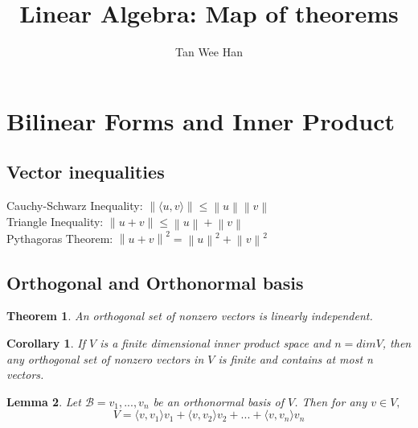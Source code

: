 \documentclass{article}
\newcommand{\norm}[1]{\left\lVert#1\right\rVert}
\newcommand{\innerproduct}[1]{\langle#1\rangle}
\newtheorem{theorem}{Theorem}[section]
\newtheorem{corollary}{Corollary}[theorem]
\newtheorem{lemma}[theorem]{Lemma}
\numberwithin{theorem}{subsection} %
\begin{document}
\title{\Large{\textbf{Linear Algebra: Map of theorems}}}
\author{Tan Wee Han}
\maketitle

\let\cleardoublepage\clearpage
\tableofcontents

\pagestyle{plain} %

\makeatletter
\makeatother


\section{Bilinear Forms and Inner Product}


\subsection{Vector inequalities}
Cauchy-Schwarz Inequality: $\norm{\innerproduct{u,v}} \leq \norm{u}\norm{v}$ \\
Triangle Inequality: $\norm{u+v} \leq \norm{u} + \norm{v}$ \\
Pythagoras Theorem: $\norm{u+v}^2 = \norm{u}^2 + \norm{v}^2$ \bigskip

\subsection{Orthogonal and Orthonormal basis}
\begin{theorem}
    An orthogonal set of nonzero vectors is linearly independent.
\end{theorem}

\begin{corollary}
    If $V$ is a finite dimensional inner product space and $n=dim V$, then any orthogonal set of nonzero vectors in $V$ is finite and contains at most n vectors.
\end{corollary}

\begin{lemma}
    Let $ \mathcal{B} = {v_1,...,v_n}$ be an orthonormal basis of $V$. Then for any $v \in V,$ \\
    \begin{equation*}
        V = \innerproduct{v,v_1}v_1 + \innerproduct{v,v_2}v_2 +...+
        \innerproduct{v,v_n}v_n
    \end{equation*}
\end{lemma}
\end{document}
